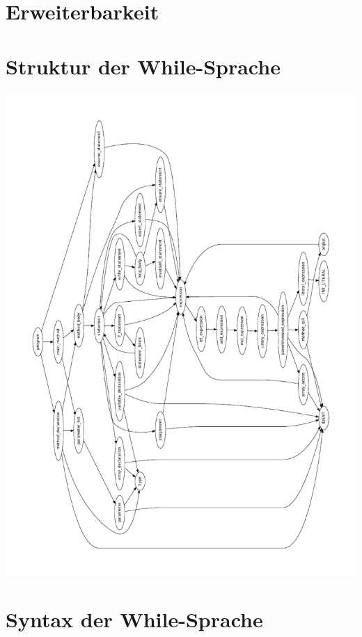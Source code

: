 \documentclass[10pt,a4paper,titlepage]{article}
\begin{document}
\section{Erweiterbarkeit}


\section{Struktur der While-Sprache}
\includegraphics[scale=1]{images/DependencyGraph.pdf}

\section{Syntax der While-Sprache}
\end{document}
